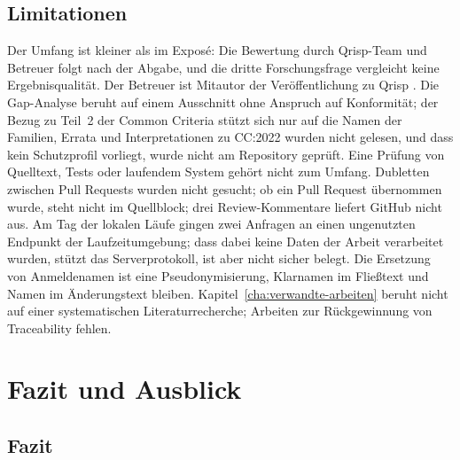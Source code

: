 \documentclass[11pt,a4paper]{report}
\begin{document}
\section{Limitationen}
\label{sec:disk-limitationen}

Der Umfang ist kleiner als im Exposé: Die Bewertung durch Qrisp-Team und
Betreuer folgt nach der Abgabe, und die
dritte Forschungsfrage vergleicht keine Ergebnisqualität. Der Betreuer
ist Mitautor der Veröffentlichung zu Qrisp \cite{seidel2024qrisp}. Die
Gap-Analyse beruht auf einem Ausschnitt ohne Anspruch auf Konformität;
der Bezug zu Teil~2 der Common Criteria stützt sich nur auf die Namen
der Familien, Errata und Interpretationen zu CC:2022 wurden nicht
gelesen, und dass kein Schutzprofil vorliegt, wurde nicht am Repository
geprüft. Eine Prüfung von Quelltext, Tests oder laufendem System gehört
nicht zum Umfang. Dubletten zwischen Pull Requests wurden nicht gesucht;
ob ein Pull Request übernommen wurde, steht nicht im Quellblock; drei
Review-Kommentare liefert GitHub nicht aus. Am Tag der lokalen Läufe
gingen zwei Anfragen an einen ungenutzten Endpunkt der Laufzeitumgebung;
dass dabei keine Daten der Arbeit verarbeitet wurden, stützt das
Serverprotokoll, ist aber nicht sicher belegt. Die Ersetzung von
Anmeldenamen ist eine Pseudonymisierung, Klarnamen im Fließtext und Namen
im Änderungstext bleiben. Kapitel~\ref{cha:verwandte-arbeiten} beruht
nicht auf einer systematischen Literaturrecherche; Arbeiten zur
Rückgewinnung von Traceability fehlen.

\chapter{Fazit und Ausblick}
\label{cha:fazit}

\section{Fazit}
\label{sec:fazit}
\end{document}
